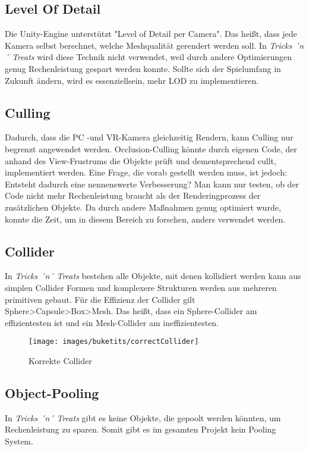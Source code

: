 \subsection{Level Of Detail}
Die Unity-Engine unterstützt "Level of Detail per Camera". Das heißt, dass jede Kamera selbst berechnet, welche Meshqualität gerendert werden soll. In \emph{Tricks ´n´ Treats} wird diese Technik nicht verwendet, weil durch andere Optimierungen genug Rechenleistung gespart werden konnte. Sollte sich der Spielumfang in Zukunft ändern, wird es essenziellsein, mehr LOD zu implementieren.

\subsection{Culling}
Dadurch, dass die PC -und VR-Kamera gleichzeitig Rendern, kann Culling nur begrenzt angewendet werden. Occlusion-Culling könnte durch eigenen Code, der anhand des View-Frustrums die Objekte prüft und dementsprechend cullt, implementiert werden. Eine Frage, die vorab gestellt werden muss, ist jedoch: Entsteht dadurch eine nennenswerte Verbesserung? Man kann nur testen, ob der Code nicht mehr Rechenleistung braucht als der Renderingprozess der zusätzlichen Objekte. Da durch andere Maßnahmen genug optimiert wurde, konnte die Zeit, um in diesem Bereich zu forschen, anders verwendet werden.

\subsection{Collider}
In \emph{Tricks ´n´ Treats} bestehen alle Objekte, mit denen kollidiert werden kann aus simplen Collider Formen und komplexere Strukturen werden aus mehreren primitiven gebaut. 
Für die Effizienz der Collider gilt Sphere>Capsule>Box>Mesh. Das heißt, dass ein Sphere-Collider am effizientesten ist und ein Mesh-Collider am ineffizientesten.

\begin{figure}[H]
	\centering
	\texttt{[image: images/buketits/correctCollider]}
	\caption{Korrekte Collider}
\end{figure}

\subsection{Object-Pooling}
In \emph{Tricks ´n´ Treats} gibt es keine Objekte, die gepoolt werden könnten, um Rechenleistung zu sparen. Somit gibt es im gesamten Projekt kein Pooling System.

